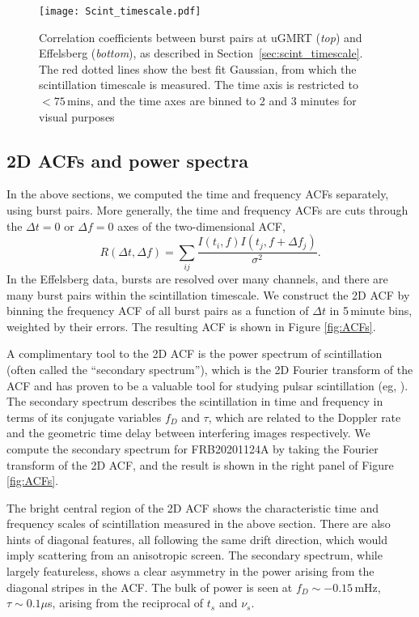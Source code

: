 \documentclass[fleqn,usenatbib]{mnras}
\begin{document}
\begin{figure}
    \centering
    \texttt{[image: Scint\_timescale.pdf]} \\
    \vspace{-5mm}
    \caption{ Correlation coefficients between burst pairs at uGMRT (\textit{top}) and Effelsberg (\textit{bottom}), as described in Section~\ref{sec:scint_timescale}.  The red dotted lines show the best fit Gaussian, from which the scintillation timescale is measured. The time axis is restricted to $< 75$\,mins, and the time axes are binned to 2 and 3 minutes for visual purposes }
    \label{fig:scinttimescale}
\end{figure}


\subsection{2D ACFs and power spectra}

In the above sections, we computed the time and frequency ACFs separately, using burst pairs.  More generally, the time and frequency ACFs are cuts through the $\Delta t=0$ or $\Delta f=0$ axes of the two-dimensional ACF,
\begin{equation}
R(\Delta t, \Delta f) = \sum_{ij}\frac{ I(t_{i}, f) I(t_{j}, f + \Delta f_{j}) }{ \sigma^{2} }.
\end{equation}
In the Effelsberg data, bursts are resolved over many channels, and there are many burst pairs within the scintillation timescale.  We construct the 2D ACF by binning the frequency ACF of all burst pairs as a function of $\Delta t$ in 5\,minute bins, weighted by their errors.  The resulting ACF is shown in Figure \ref{fig:ACFs}.

A complimentary tool to the 2D ACF is the power spectrum of scintillation (often called the ``secondary spectrum''), which is the 2D Fourier transform of the ACF and has proven to be a valuable tool for studying pulsar scintillation (eg, \citealt{stinebring+01, brisken+10}).  The secondary spectrum describes the scintillation in time and frequency in terms of its conjugate variables $f_{D}$ and $\tau$, which are related to the Doppler rate and the geometric time delay between interfering images respectively.  We compute the secondary spectrum for FRB20201124A by taking the Fourier transform of the 2D ACF, and the result is shown in the right panel of Figure \ref{fig:ACFs}.

The bright central region of the 2D ACF shows the characteristic time and frequency scales of scintillation measured in the above section.  There are also hints of diagonal features, all following the same drift direction, which would imply scattering from an anisotropic screen.  The secondary spectrum, while largely featureless, shows a clear asymmetry in the power arising from the diagonal stripes in the ACF.  The bulk of power is seen at $f_{D}\sim -0.15\,$mHz, $\tau \sim 0.1 \mu$s, arising from the reciprocal of $t_{s}$ and $\nu_{s}$.
\end{document}
